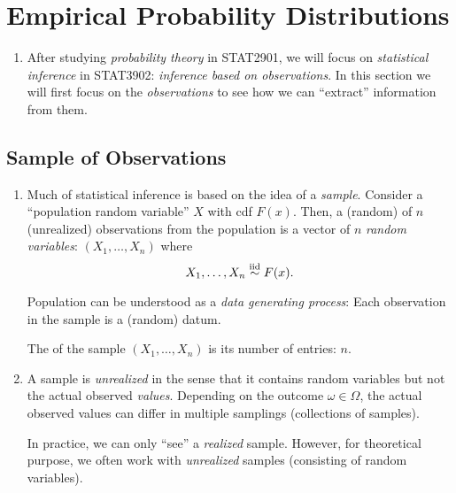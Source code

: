 \section{Empirical Probability Distributions}
\label{sect:empirical-prob-dist}
\begin{enumerate}
\item After studying \emph{probability theory} in STAT2901, we will focus on
\emph{statistical inference} in STAT3902: \emph{inference based on
observations}. In this section we will first focus on the \emph{observations} to
see how we can ``extract'' information from them.
\end{enumerate}
\subsection{Sample of Observations}
\begin{enumerate}
\item Much of statistical inference is based on the idea of a \emph{sample}.
Consider a ``population random variable'' \(X\) with cdf \(F(x)\). Then, a
(random)  of \(n\) (unrealized) observations from the population
is a vector of \(n\) \emph{random variables}: \((X_1,\dotsc,X_n)\) where
\[
X_1,\dotsc,X_n\overset{\text{iid}}{\sim} F(x).
\]
\begin{center}
\end{center}
\begin{intuition}
Population can be understood as a \emph{data generating process}: Each
observation in the sample is a (random) datum.
\end{intuition}

\begin{note}
The  of the sample \((X_1,\dotsc,X_n)\) is its number of
entries: \(n\).
\end{note}
\item A sample is \emph{unrealized} in the sense that it contains random
variables but not the actual observed \emph{values}. Depending on the outcome
\(\omega\in\Omega\), the actual observed values can differ in multiple
samplings (collections of samples).

In practice, we can only ``see''  a \emph{realized} sample. However, for
theoretical purpose, we often work with \emph{unrealized} samples (consisting of
random variables).
\end{enumerate}

